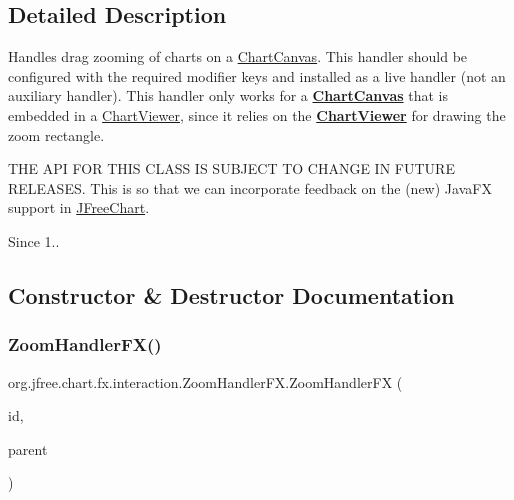 \subsection{Detailed Description}
Handles drag zooming of charts on a \mbox{\hyperlink{classorg_1_1jfree_1_1chart_1_1fx_1_1_chart_canvas}{Chart\+Canvas}}. This handler should be configured with the required modifier keys and installed as a live handler (not an auxiliary handler). This handler only works for a {\bfseries \mbox{\hyperlink{classorg_1_1jfree_1_1chart_1_1fx_1_1_chart_canvas}{Chart\+Canvas}}} that is embedded in a \mbox{\hyperlink{classorg_1_1jfree_1_1chart_1_1fx_1_1_chart_viewer}{Chart\+Viewer}}, since it relies on the {\bfseries \mbox{\hyperlink{classorg_1_1jfree_1_1chart_1_1fx_1_1_chart_viewer}{Chart\+Viewer}}} for drawing the zoom rectangle.

T\+HE A\+PI F\+OR T\+H\+IS C\+L\+A\+SS IS S\+U\+B\+J\+E\+CT TO C\+H\+A\+N\+GE IN F\+U\+T\+U\+RE R\+E\+L\+E\+A\+S\+ES. This is so that we can incorporate feedback on the (new) Java\+FX support in \mbox{\hyperlink{classorg_1_1jfree_1_1chart_1_1_j_free_chart}{J\+Free\+Chart}}.

\begin{DoxySince}{Since}
1.. 
\end{DoxySince}


\subsection{Constructor \& Destructor Documentation}
\mbox{\label{classorg_1_1jfree_1_1chart_1_1fx_1_1interaction_1_1_zoom_handler_f_x_a87838fdea9f29dab0589c0c892a7d000}} 
\subsubsection{\texorpdfstring{Zoom\+Handler\+F\+X()}{ZoomHandlerFX()}\hspace{0.1cm}{\footnotesize\ttfamily [1/2]}}
{\footnotesize\ttfamily org.\+jfree.\+chart.\+fx.\+interaction.\+Zoom\+Handler\+F\+X.\+Zoom\+Handler\+FX (\begin{DoxyParamCaption}\item[{String}]{id,  }\item[{\mbox{\hyperlink{classorg_1_1jfree_1_1chart_1_1fx_1_1_chart_viewer}{Chart\+Viewer}}}]{parent }\end{DoxyParamCaption})}


